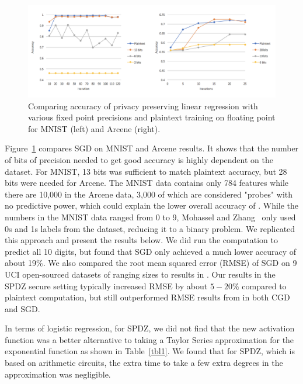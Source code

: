 \documentclass{article}
\begin{document}
\begin{figure}[h!]
\vspace{-4mm}
\centering
  \includegraphics[scale=0.6]{mnistarcene.png}
  \vspace{-4mm}
   \caption{Comparing accuracy of privacy preserving linear regression with various fixed point precisions and plaintext training on floating point for MNIST (left) and Arcene (right).}
   \label{fig:result2}  
\end{figure}

Figure~\ref{fig:result2} compares SGD on MNIST and Arcene results. It shows that the number of bits of precision needed to get good accuracy is highly dependent on the dataset. For MNIST, 13 bits was sufficient to match plaintext accuracy, but 28 bits were needed for Arcene. The MNIST data contains only 784 features while there are 10,000 in the Arcene data, 3,000 of which are considered "probes" with no predictive power, which could explain the lower overall accuracy of \cite{MZ17}. While the numbers in the MNIST data ranged from 0 to 9, Mohassel and Zhang~\cite{MZ17} only used 0s and 1s labels from the dataset, reducing it to a binary problem. We replicated this approach and present the results below. We did run the computation to predict all 10 digits, but found that SGD only achieved a much lower accuracy of about 19\%. We also compared the root mean squared error (RMSE) of SGD on 9 UCI open-sourced datasets of ranging sizes to results in \cite{GSB0DZE17}. Our results in the SPDZ secure setting typically increased RMSE by about $5-20\%$ compared to plaintext computation, but still outperformed RMSE results from \cite{GSB0DZE17} in both CGD and SGD.

In terms of logistic regression, for SPDZ, we did not find that the new activation function was a better alternative to taking a Taylor Series approximation for the exponential function as shown in Table~\ref{tbl1}. We found that for SPDZ, which is based on arithmetic circuits, the extra time to take a few extra degrees in the approximation was negligible.  
\end{document}
